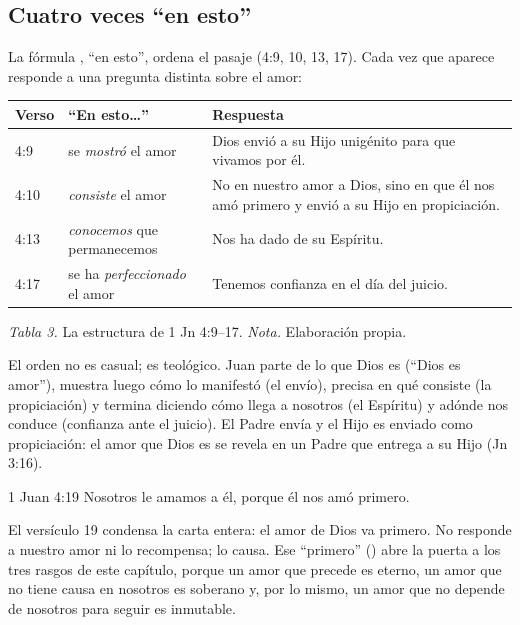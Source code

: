 \subsection{Cuatro veces “en esto”}
La fórmula , ``en esto'', ordena el pasaje (4:9, 10, 13, 17). Cada vez que aparece responde a una pregunta distinta sobre el amor:

\begin{center}\small\renewcommand{\arraystretch}{1.2}
\begin{tabular}{@{}L{1.6cm}L{4.4cm}L{8.8cm}@{}}
\toprule
\textbf{Verso} & \textbf{``En esto\ldots''} & \textbf{Respuesta} \\ :9 & se \emph{mostró} el amor & Dios envió a su Hijo unigénito para que vivamos por él. \\
4:10 & \emph{consiste} el amor & No en nuestro amor a Dios, sino en que él nos amó primero y envió a su Hijo en propiciación. \\
4:13 & \emph{conocemos} que permanecemos & Nos ha dado de su Espíritu. \\
4:17 & se ha \emph{perfeccionado} el amor & Tenemos confianza en el día del juicio. \\
\bottomrule
\end{tabular}\par
{\footnotesize\color{gris}\textit{Tabla 3.} La estructura de 1 Jn 4:9--17. \textit{Nota.} Elaboración propia.}
\end{center}

El orden no es casual; es teológico. Juan parte de lo que Dios es (``Dios es amor''), muestra luego cómo lo manifestó (el envío), precisa en qué consiste (la propiciación) y termina diciendo cómo llega a nosotros (el Espíritu) y adónde nos conduce (confianza ante el juicio). El Padre envía y el Hijo es enviado como propiciación: el amor que Dios es se revela en un Padre que entrega a su Hijo (Jn 3:16).

\begin{verso}{1 Juan 4:19}
Nosotros le amamos a él, porque él nos amó primero.
\end{verso}

El versículo 19 condensa la carta entera: el amor de Dios va primero. No responde a nuestro amor ni lo recompensa; lo causa. Ese ``primero'' () abre la puerta a los tres rasgos de este capítulo, porque un amor que precede es eterno, un amor que no tiene causa en nosotros es soberano y, por lo mismo, un amor que no depende de nosotros para seguir es inmutable.

